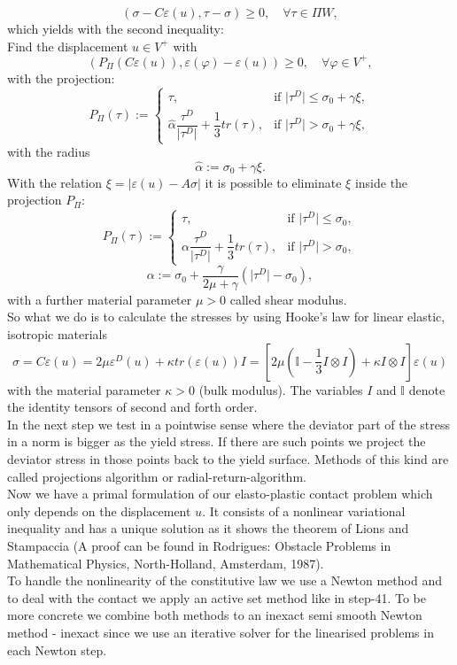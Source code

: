 \documentclass{article}
\begin{document}
$$\left(\sigma - C\varepsilon(u), \tau - \sigma\right) \geq 0,\quad \forall \tau\in \Pi W,$$
which yields with the second inequality:\\
Find the displacement $u\in V^+$ with
$$\left(P_{\Pi}(C\varepsilon(u)),\varepsilon(\varphi) - \varepsilon(u)\right) \geq 0,\quad \forall \varphi\in V^+,$$
with the projection:
$$P_{\Pi}(\tau):=\begin{cases}
			\tau, & \text{if }\vert\tau^D\vert \leq \sigma_0 +  \gamma\xi,\\
			\hat\alpha\dfrac{\tau^D}{\vert\tau^D\vert} + \dfrac{1}{3}tr(\tau), & \text{if }\vert\tau^D\vert > \sigma_0 +  \gamma\xi,
			\end{cases}$$
with the radius
$$\hat\alpha := \sigma_0 + \gamma\xi .$$
With the relation $\xi = \vert\varepsilon(u) - A\sigma\vert$ it is possible to eliminate $\xi$ inside the projection $P_{\Pi}$:\\
$$P_{\Pi}(\tau):=\begin{cases}
			\tau, & \text{if }\vert\tau^D\vert \leq \sigma_0,\\
			\alpha\dfrac{\tau^D}{\vert\tau^D\vert} + \dfrac{1}{3}tr(\tau), & \text{if }\vert\tau^D\vert > \sigma_0,
			\end{cases}$$
$$\alpha := \sigma_0 + \dfrac{\gamma}{2\mu+\gamma}\left(\vert\tau^D\vert - \sigma_0\right) ,$$
with a further material parameter $\mu>0$ called shear modulus.\\
So what we do is to calculate the stresses by using Hooke's law for linear elastic,  isotropic materials
$$\sigma = C \varepsilon(u) = 2\mu \varepsilon^D(u) + \kappa tr(\varepsilon(u))I = \left[2\mu\left(\mathbb{I} -\dfrac{1}{3} I\otimes I\right) + \kappa I\otimes I\right]\varepsilon(u)$$
with the material parameter $\kappa>0$ (bulk modulus). The variables $I$ and $\mathbb{I}$ denote the identity tensors of second and forth order.\\
In the next step we test in a pointwise sense where the deviator part of the stress in a norm is bigger as the yield stress.
If there are such points we project the deviator stress in those points back to the yield surface. Methods of this kind
are called projections algorithm or radial-return-algorithm.\\
Now we have a primal formulation of our elasto-plastic contact problem which only depends on the displacement $u$.
It consists of a nonlinear variational inequality and has a unique solution as it shows the theorem of Lions and Stampaccia
(A proof can be found in Rodrigues: Obstacle Problems in Mathematical Physics, North-Holland, Amsterdam, 1987).\\
To handle the nonlinearity of the constitutive law we use a Newton method and to deal with the contact we apply an
active set method like in step-41. To be more concrete we combine both methods to an inexact semi smooth Newton
method - inexact since we use an iterative solver for the linearised problems in each Newton step.
\end{document}
